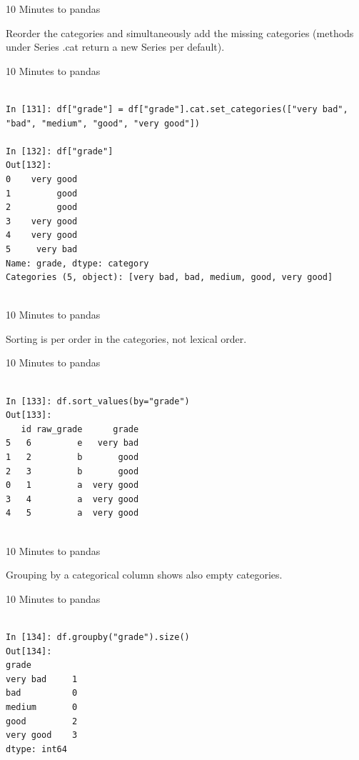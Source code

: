 \documentclass{beamer}
\begin{document}
\begin{frame}[t]{10 Minutes to pandas}

Reorder the categories and simultaneously add the missing categories (methods under Series
.cat return a new Series per default).

\end{frame}


\begin{frame}[t,fragile]{10 Minutes to pandas}


	\scriptsize
\begin{verbatim}

In [131]: df["grade"] = df["grade"].cat.set_categories(["very bad", "bad", "medium", "good", "very good"])

In [132]: df["grade"]
Out[132]: 
0    very good
1         good
2         good
3    very good
4    very good
5     very bad
Name: grade, dtype: category
Categories (5, object): [very bad, bad, medium, good, very good]


\end{verbatim}


\end{frame}


\begin{frame}[t]{10 Minutes to pandas}

Sorting is per order in the categories, not lexical order.

\end{frame}


\begin{frame}[t,fragile]{10 Minutes to pandas}


	\scriptsize
\begin{verbatim}

In [133]: df.sort_values(by="grade")
Out[133]: 
   id raw_grade      grade
5   6         e   very bad
1   2         b       good
2   3         b       good
0   1         a  very good
3   4         a  very good
4   5         a  very good


\end{verbatim}


\end{frame}


\begin{frame}[t]{10 Minutes to pandas}

Grouping by a categorical column shows also empty categories.

\end{frame}


\begin{frame}[t,fragile]{10 Minutes to pandas}


	\scriptsize
\begin{verbatim}

In [134]: df.groupby("grade").size()
Out[134]: 
grade
very bad     1
bad          0
medium       0
good         2
very good    3
dtype: int64


\end{verbatim}


\end{frame}
\end{document}
